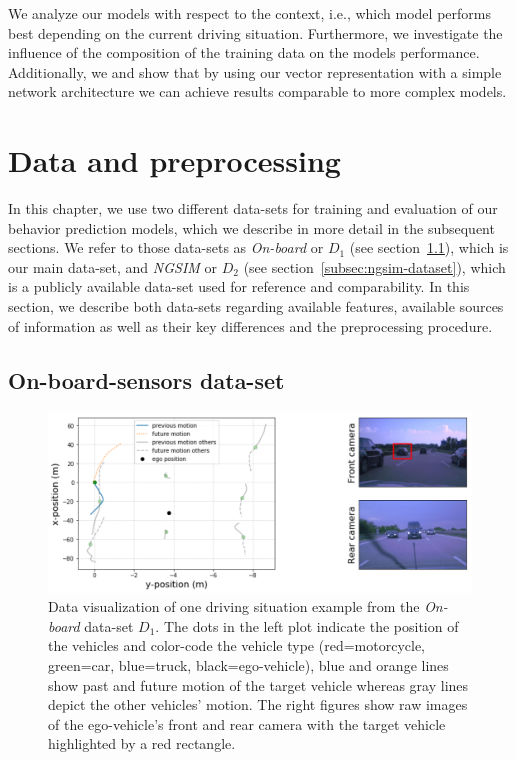 We analyze our models with respect to the context, i.e., which model performs best depending on the current driving situation.
Furthermore, we investigate the influence of the composition of the training data on the models performance.
Additionally, we 
and show that by using our vector representation with a simple network architecture we can achieve results comparable to more complex models.

\section{Data and preprocessing}
\label{sec:data_preproc}

In this chapter, we use two different data-sets for training and evaluation of our behavior prediction models, which we describe in more detail in the subsequent sections.
We refer to those data-sets as \emph{On-board} or $D_1$ (see section~\ref{subsec:onboard-dataset}), which is our main data-set, and \emph{\acs{NGSIM}} or $D_2$ (see section~\ref{subsec:ngsim-dataset}), which is a publicly available data-set used for reference and comparability.
In this section, we describe both data-sets regarding available features, available sources of information as well as their key differences and the preprocessing procedure.

\subsection{On-board-sensors data-set}
\label{subsec:onboard-dataset}

\begin{figure}[t!]
	\centering
	\includegraphics[width=\textwidth]{imgs/on_board_example_with_imgs_target.png}
    \caption{Data visualization of one driving situation example from the \emph{On-board} data-set $D_1$.
        The dots in the left plot indicate the position of the vehicles and color-code the vehicle type (red=motorcycle, green=car, blue=truck, black=ego-vehicle), blue and orange lines show past and future motion of the target vehicle whereas gray lines depict the other vehicles' motion.
        The right figures show raw images of the ego-vehicle's front and rear camera with the target vehicle
    highlighted by a red rectangle.}\label{fig:on_board_data_example}
\end{figure}

